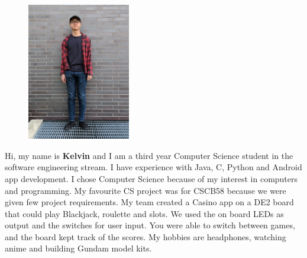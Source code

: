 \documentclass[12pt]{scrreprt}
\begin{document}
\begin{figure} 
	\includegraphics[angle=-90,origin=c,width=0.4\textwidth]{kelvin}
\end{figure}
\noindent Hi, my name is \textbf{Kelvin} and I am a third year Computer Science student in the software engineering stream. I have experience with Java, C, Python and Android app development. I chose Computer Science because of my interest in computers and programming. My favourite CS project was for CSCB58 because we were given few project requirements. My team created a Casino app on a DE2 board that could play Blackjack, roulette and slots. We used the on board LEDs as output and the switches for user input. You were able to switch between games, and the board kept track of the scores. My hobbies are headphones, watching anime and building Gundam model kits.\\\\\\\\
\end{document}
